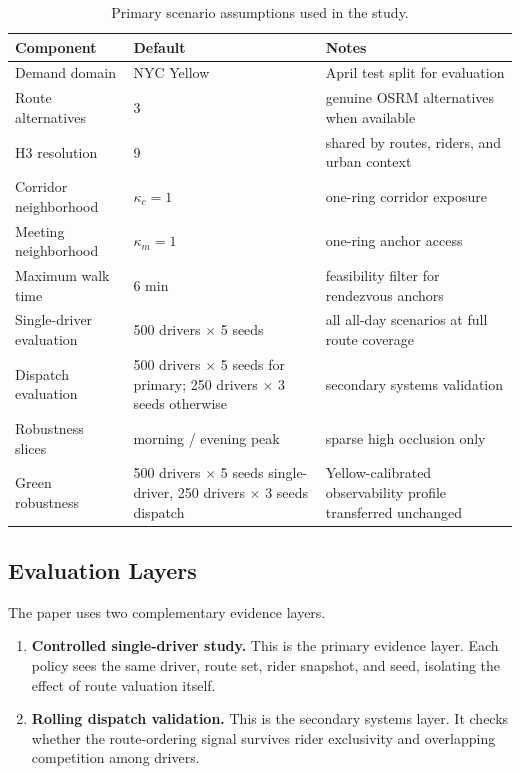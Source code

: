 \documentclass[journal]{IEEEtran}
\begin{document}
\begin{table}[t]
\caption{Primary scenario assumptions used in the study.}
\label{tab:assumptions}
\centering
\footnotesize
\begin{tabularx}{\columnwidth}{L{0.32\columnwidth}L{0.22\columnwidth}Y}
\toprule
Component & Default & Notes \\
\midrule
Demand domain & NYC Yellow & April test split for evaluation \\
Route alternatives & 3 & genuine OSRM alternatives when available \\
H3 resolution & 9 & shared by routes, riders, and urban context \\
Corridor neighborhood & $\kappa_c=1$ & one-ring corridor exposure \\
Meeting neighborhood & $\kappa_m=1$ & one-ring anchor access \\
Maximum walk time & 6 min & feasibility filter for rendezvous anchors \\
Single-driver evaluation & 500 drivers $\times$ 5 seeds & all all-day scenarios at full route coverage \\
Dispatch evaluation & 500 drivers $\times$ 5 seeds for primary; 250 drivers $\times$ 3 seeds otherwise & secondary systems validation \\
Robustness slices & morning / evening peak & sparse high occlusion only \\
Green robustness & 500 drivers $\times$ 5 seeds single-driver, 250 drivers $\times$ 3 seeds dispatch & Yellow-calibrated observability profile transferred unchanged \\
\bottomrule
\end{tabularx}
\end{table}

\subsection{Evaluation Layers}
The paper uses two complementary evidence layers.
\begin{enumerate}
\item \textbf{Controlled single-driver study.} This is the primary evidence layer. Each policy sees the same driver, route set, rider snapshot, and seed, isolating the effect of route valuation itself.
\item \textbf{Rolling dispatch validation.} This is the secondary systems layer. It checks whether the route-ordering signal survives rider exclusivity and overlapping competition among drivers.
\end{enumerate}
\end{document}
